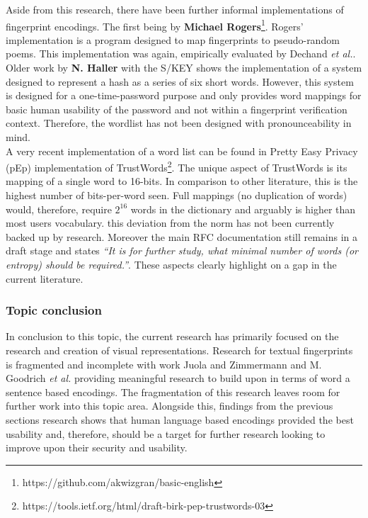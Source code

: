 Aside from this research, there have been further informal implementations of fingerprint encodings. The first being by \textbf{Michael Rogers}\footnote{https://github.com/akwizgran/basic-english}. Rogers' implementation is a program designed to map fingerprints to pseudo-random poems. This implementation was again, empirically evaluated by Dechand \textit{et al.}\cite{dechand2016empirical}. Older work by \textbf{N. Haller} with the S/KEY\cite{haller1995s} shows the implementation of a system designed to represent a hash as a series of six short words. However, this system is designed for a one-time-password purpose and only provides word mappings for basic human usability of the password and not within a fingerprint verification context. Therefore, the wordlist has not been designed with pronounceability in mind.
\\
A very recent implementation of a word list can be found in Pretty Easy Privacy (pEp) implementation of TrustWords\footnote{https://tools.ietf.org/html/draft-birk-pep-trustwords-03}. The unique aspect of TrustWords is its mapping of a single word to 16-bits. In comparison to other literature, this is the highest number of bits-per-word seen. Full mappings (no duplication of words) would, therefore, require $2^{16}$ words in the dictionary and arguably is higher than most users vocabulary. this deviation from the norm has not been currently backed up by research. Moreover the main RFC documentation still remains in a draft stage and states \textit{``It is for further study, what minimal number of words (or entropy) should be required.''}. These aspects clearly highlight on a gap in the current literature.

\subsubsection{Topic conclusion}

In conclusion to this topic, the current research has primarily focused on the research and creation of visual representations. Research for textual fingerprints is fragmented and incomplete with work Juola and Zimmermann 
\cite{juola1996whole} and M. Goodrich \textit{et al.}\cite{goodrich2006loud} providing meaningful research to build upon in terms of word a sentence based encodings. The fragmentation of this research leaves room for further work into this topic area. Alongside this, findings from the previous sections research shows that human language based encodings provided the best usability and, therefore, should be a target for further research looking to improve upon their security and usability.


